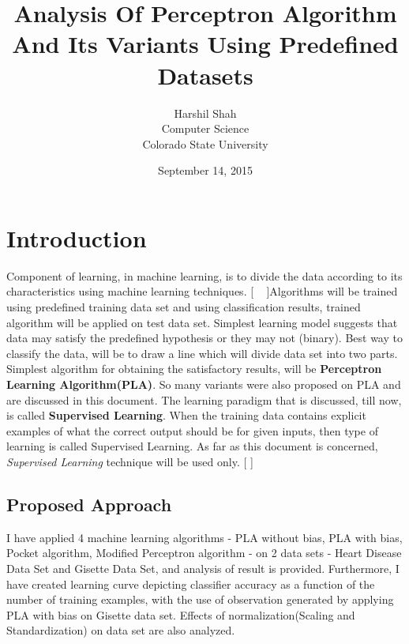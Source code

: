 \documentclass{article}
\title{Analysis Of Perceptron Algorithm And Its Variants Using Predefined Datasets}
\author{Harshil Shah\\Computer Science\\Colorado State University}
\date{September 14, 2015}
\begin{document}
\maketitle

\noindent
\hrulefill
\vspace{-5mm} 
\tableofcontents
\noindent
\hrulefill
\setlength{\parindent}{5ex} 

\section{Introduction}
Component of learning, in machine learning, is to divide the data according to its characteristics using machine learning techniques. [ ~\citep{Online1} ]Algorithms will be trained using predefined training data set and using classification results, trained algorithm will be applied on test data set. Simplest learning model suggests that data may satisfy the predefined hypothesis or they may not (binary). Best way to classify the data, will be to draw a line which will divide data set into two parts. Simplest algorithm for obtaining the satisfactory results, will be \textbf{Perceptron Learning Algorithm(PLA)}. So many variants were also proposed on PLA and are discussed in this document. The learning paradigm that is discussed, till now, is called  \textbf{Supervised Learning}. When the training data contains explicit examples of what the correct output should be for given inputs, then type of learning is called Supervised Learning. As far as this document is concerned, \textit{Supervised Learning} technique will be used only. [ \cite{Book1} ]
\subsection{Proposed Approach}
I have applied 4 machine learning algorithms - PLA without bias, PLA with bias, Pocket algorithm, Modified Perceptron algorithm - on 2 data sets - Heart Disease Data Set and Gisette Data Set, and analysis of result is provided. Furthermore, I have created learning curve depicting classifier accuracy as a function of the number of training examples, with the use of observation generated by applying PLA with bias on Gisette data set. Effects of normalization(Scaling and Standardization) on data set are also analyzed. 
\end{document}
